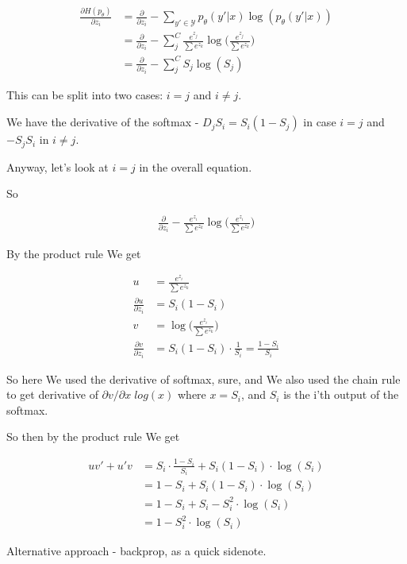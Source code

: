 \documentclass{article}
\begin{document}
		\begin{align}
			\frac{\partial H(p_\theta)}{\partial z_i} &= \frac{\partial }{\partial z_i} -\sum_{y'\in\mathcal{Y}} p_\theta(y'|x)\log(p_\theta(y'|x))\\
		&= \frac{\partial }{\partial z_i} -\sum_{j}^{C} \frac{e^{z_j}}{\sum e^{z_k}}\log\bigg(\frac{e^{z_j}}{\sum e^{z_k}}\bigg)\\
		&= \frac{\partial }{\partial z_i} -\sum_{j}^{C} S_j\log(S_j)
		\end{align}
		
		This can be split into two cases: $i=j$ and $i\neq j$.
		
		We have the derivative of the softmax - $D_jS_i = S_i(1-S_j)$ in case $i=j$ and $-S_jS_i$ in $i\neq j$.
		
		Anyway, let's look at $i=j$ in the overall equation.
		
		So
		
		\begin{align}
			\frac{\partial }{\partial z_i} - \frac{e^{z_i}}{\sum e^{z_k}}\log\bigg(\frac{e^{z_i}}{\sum e^{z_k}}\bigg)
		\end{align}
		
		By the product rule We get
		
		\begin{align}
			u &= \frac{e^{z_i}}{\sum e^{z_k}}\\
			\frac{\partial u}{\partial z_i} &= S_i(1-S_i)\\
			v &= \log\bigg(\frac{e^{z_i}}{\sum e^{z_k}}\bigg)\\
			\frac{\partial v}{\partial z_i} &= S_i(1-S_i) \cdot \frac{1}{S_i} = \frac{1-S_i}{S_i}
		\end{align}
		
		So here We used the derivative of softmax, sure, and We also used the chain rule to get derivative of $\partial v/\partial x\; log(x)$ where $x=S_i$, and $S_i$ is the i'th output of the softmax.
		
		So then by the product rule We get 
		
		\begin{align}
			uv' + u'v &= S_i\cdot \frac{1-S_i}{S_i} + S_i(1-S_i)\cdot \log(S_i)\\
			&= 1-S_i + S_i(1-S_i)\cdot \log(S_i)\\
			&= 1-S_i + S_i-S_i^2\cdot \log(S_i)\\
			&= 1 - S_i^2\cdot \log(S_i)
		\end{align}
		
		Alternative approach - backprop, as a quick sidenote.
		
\end{document}
